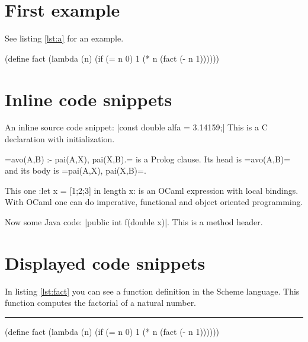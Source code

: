 \documentclass[12pt]{article}
\begin{document}
\section{First example}

See listing \ref{lst:a} for an example.

\begin{pygmented}[
  lang=scheme,
  linenos,
  backgroundcolor=shadecolor,
  label=lst:a,
  caption=A \textsl{Scheme} program.,
  ]
(define fact
    (lambda (n)
        (if (= n 0)
            1
            (* n (fact (- n 1))))))
\end{pygmented}


\section{Inline code snippets}

An inline source code snippet:
\pyginline[lang=c]|const double alfa = 3.14159;|
This is a C declaration with initialization.

\pyginline[lang=prolog,backgroundcolor=yellow]=avo(A,B) :- pai(A,X), pai(X,B).=
is a Prolog clause. Its head is
\pyginline[lang=prolog,style=emacs,backgroundcolor=yellow,linecolor=red]=avo(A,B)=
and its body is
\pyginline[lang=prolog,style=vim,backgroundcolor=black,hidealllines]=pai(A,X), pai(X,B)=.


This one
\pyginline[lang=ocaml,font=\ttfamily\scriptsize,topline=false]:let x = [1;2;3] in length x:
is an OCaml expression with local bindings. With OCaml one can do
imperative, functional and object oriented programming.

Now some Java code:
\pyginline[lang=java,style=colorful,font=\ttfamily\itshape,linewidth=1pt]|public int f(double x)|.
This is a method header.

\section{Displayed code snippets}


In listing \ref{lst:fact} you can see a function definition in the
Scheme language. This function computes the factorial of a natural
number.  \newline\rule{\linewidth}{2pt}
\begin{pygmented}[
  style=emacs,
  rightline=false,
  linenos,
  label=lst:fact,
  caption=A \textbf{Scheme} function.
  ]
(define fact
    (lambda (n)
        (if (= n 0)
            1
            (* n (fact (- n 1))))))
\end{pygmented}
\end{document}
